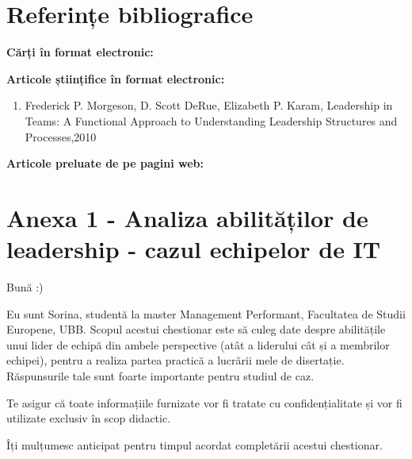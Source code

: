 \documentclass[a4paper, 12pt]{article}
\begin{document}
	
	








\newpage

	\section*{Referințe bibliografice}
	\space
	\bigskip
	\bigskip

	\textbf{Cărți în format electronic:}
	

	\textbf{Articole științifice în format electronic:}
	\begin{enumerate}[1.]
		\item Frederick P. Morgeson, D. Scott DeRue, Elizabeth P. Karam, Leadership in Teams: A Functional Approach to Understanding Leadership Structures and Processes,2010
	\end{enumerate}

	\textbf{Articole preluate de pe pagini web:}




\newpage
	\section*{Anexa 1 - Analiza abilităților de leadership - cazul echipelor de IT }	

	\thispagestyle{empty}
	 
	\qquad\space Bună :)

      \quad Eu sunt Sorina, studentă la master Management Performant, Facultatea de Studii Europene, UBB. Scopul acestui chestionar este să culeg date despre abilitățile unui lider de echipă din ambele perspective (atât a liderului cât și a membrilor echipei), pentru a realiza partea practică a lucrării mele de disertație. Răspunsurile tale sunt foarte importante pentru studiul de caz.

	\quad Te asigur că toate informațiile furnizate vor fi tratate cu confidențialitate și vor fi utilizate exclusiv în scop didactic.

	\quad Îți mulțumesc anticipat pentru timpul acordat completării acestui chestionar.
	\newline
\end{document}
